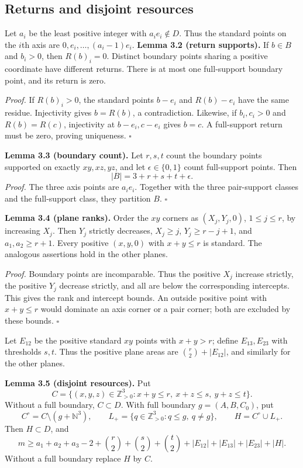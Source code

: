 \documentclass[11pt]{article}
\begin{document}
\subsection{Returns and disjoint resources}
Let $a_i$ be the least positive integer with $a_ie_i\notin D$.
Thus the standard points on the $i$th axis are $0,e_i,\ldots,(a_i-1)e_i$.
\label{res:A.1}
\textbf{Lemma 3.2 (return supports).}
If $b\in B$ and $b_i>0$, then $R(b)_i=0$.
Distinct boundary points sharing a positive coordinate have different
returns. There is at most one full-support boundary point, and its return
is zero.

\emph{Proof.}
If $R(b)_i>0$, the standard points $b-e_i$ and $R(b)-e_i$ have the
same residue. Injectivity gives $b=R(b)$, a contradiction.
Likewise, if $b_i,c_i>0$ and $R(b)=R(c)$, injectivity at $b-e_i,c-e_i$
gives $b=c$. A full-support return must be zero, proving uniqueness.
\ensuremath{\square}

\label{res:A.2}
\textbf{Lemma 3.3 (boundary count).}
Let $r,s,t$ count the boundary points supported on exactly $xy,xz,yz$,
and let $\epsilon\in\{0,1\}$ count full-support points. Then
\[
 |B|=3+r+s+t+\epsilon.
\]
\emph{Proof.}
The three axis points are $a_ie_i$. Together with the three pair-support
classes and the full-support class, they partition $B$. \ensuremath{\square}

\label{res:A.3}
\textbf{Lemma 3.4 (plane ranks).}
Order the $xy$ corners as $(X_j,Y_j,0)$, $1\le j\le r$, by increasing
$X_j$. Then $Y_j$ strictly decreases,
$X_j\ge j$, $Y_j\ge r-j+1$, and $a_1,a_2\ge r+1$.
Every positive $(x,y,0)$ with $x+y\le r$ is standard.
The analogous assertions hold in the other planes.

\emph{Proof.}
Boundary points are incomparable. Thus the positive $X_j$ increase
strictly, the positive $Y_j$ decrease strictly, and all are below the
corresponding intercepts. This gives the rank and intercept bounds.
An outside positive point with $x+y\le r$ would dominate an axis corner
or a pair corner; both are excluded by these bounds. \ensuremath{\square}

Let $E_{12}$ be the positive standard $xy$ points with $x+y>r$;
define $E_{13},E_{23}$ with thresholds $s,t$. Thus the positive plane
areas are $\binom r2+|E_{12}|$, and similarly for the other planes.

\label{res:A.4}
\textbf{Lemma 3.5 (disjoint resources).}
Put
\[
 C=\{(x,y,z)\in\mathbb Z_{>0}^3:x+y\le r,\ x+z\le s,\ y+z\le t\}.
\]
Without a full boundary, $C\subset D$. With full boundary
$g=(A,B,C_0)$, put
\[
 C^\circ=C\setminus(g+\mathbb N^3),\qquad
 L_+=\{q\in\mathbb Z_{>0}^3:q\le g,\ q\ne g\},\qquad H=C^\circ\cup L_+.
\]
Then $H\subset D$, and
\[
 m\ge a_1+a_2+a_3-2+
 \binom r2+\binom s2+\binom t2+
 |E_{12}|+|E_{13}|+|E_{23}|+|H|.\tag{3.1}
\]
Without a full boundary replace $H$ by $C$.
\end{document}
